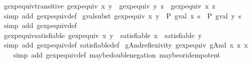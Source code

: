 \begin{isabellebody}
\endisatagproof
{\isafoldproof}%
%
\isadelimproof
\isanewline
%
\endisadelimproof
\isanewline
{}\isamarkupfalse%
\ gexp{\isacharunderscore}equiv{\isacharunderscore}transitive{\isacharcolon}\ {\isachardoublequoteopen}gexp{\isacharunderscore}equiv\ x\ y\ {\isasymand}\ gexp{\isacharunderscore}equiv\ y\ z\ {\isasymLongrightarrow}\ gexp{\isacharunderscore}equiv\ x\ z{\isachardoublequoteclose}\isanewline
%
\isadelimproof
\ \ %
\endisadelimproof
%
\isatagproof
{}\isamarkupfalse%
\ {\isacharparenleft}simp\ add{\isacharcolon}\ gexp{\isacharunderscore}equiv{\isacharunderscore}def{\isacharparenright}%
\endisatagproof
{\isafoldproof}%
%
\isadelimproof
\isanewline
%
\endisadelimproof
\isanewline
{}\isamarkupfalse%
\ gval{\isacharunderscore}subst{\isacharcolon}\ {\isachardoublequoteopen}gexp{\isacharunderscore}equiv\ x\ y\ {\isasymLongrightarrow}\ P\ {\isacharparenleft}gval\ x\ s{\isacharparenright}\ {\isasymLongrightarrow}\ P\ {\isacharparenleft}gval\ y\ s{\isacharparenright}{\isachardoublequoteclose}\isanewline
%
\isadelimproof
\ \ %
\endisadelimproof
%
\isatagproof
{}\isamarkupfalse%
\ {\isacharparenleft}simp\ add{\isacharcolon}\ gexp{\isacharunderscore}equiv{\isacharunderscore}def{\isacharparenright}%
\endisatagproof
{\isafoldproof}%
%
\isadelimproof
\isanewline
%
\endisadelimproof
\isanewline
{}\isamarkupfalse%
\ gexp{\isacharunderscore}equiv{\isacharunderscore}satisfiable{\isacharcolon}\ {\isachardoublequoteopen}gexp{\isacharunderscore}equiv\ x\ y\ {\isasymLongrightarrow}\ satisfiable\ x\ {\isacharequal}\ satisfiable\ y{\isachardoublequoteclose}\isanewline
%
\isadelimproof
\ \ %
\endisadelimproof
%
\isatagproof
{}\isamarkupfalse%
\ {\isacharparenleft}simp\ add{\isacharcolon}\ gexp{\isacharunderscore}equiv{\isacharunderscore}def\ satisfiable{\isacharunderscore}def{\isacharparenright}%
\endisatagproof
{\isafoldproof}%
%
\isadelimproof
\isanewline
%
\endisadelimproof
\isanewline
{}\isamarkupfalse%
\ gAnd{\isacharunderscore}reflexivity{\isacharcolon}\ {\isachardoublequoteopen}gexp{\isacharunderscore}equiv\ {\isacharparenleft}gAnd\ x\ x{\isacharparenright}\ x{\isachardoublequoteclose}\isanewline
%
\isadelimproof
\ \ %
\endisadelimproof
%
\isatagproof
{}\isamarkupfalse%
\ {\isacharparenleft}simp\ add{\isacharcolon}\ gexp{\isacharunderscore}equiv{\isacharunderscore}def\ maybe{\isacharunderscore}double{\isacharunderscore}negation\ maybe{\isacharunderscore}or{\isacharunderscore}idempotent{\isacharparenright}%
\endisatagproof
{\isafoldproof}%
%
\isadelimproof

\end{isabellebody}
